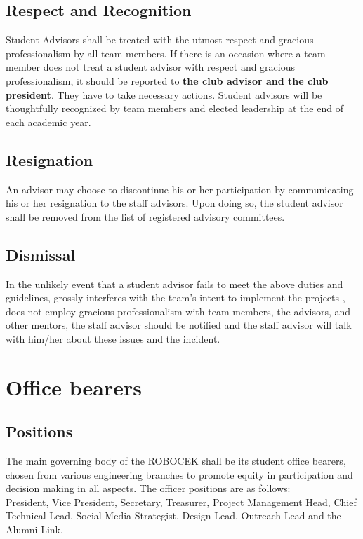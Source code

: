 \subsection{Respect and Recognition}
Student Advisors shall be treated with the utmost respect and gracious professionalism by all team members. If there is an occasion where a team member does not treat a student advisor with respect and gracious professionalism, it should be reported to \textbf{the club advisor and the club president}. They have to take necessary actions. Student advisors will be thoughtfully recognized by team members and elected leadership at the end of each academic year.

\subsection{Resignation}
An advisor may choose to discontinue his or her participation by communicating his or her resignation to the staff advisors. Upon doing so, the student advisor shall be removed from the list of registered advisory committees.

\subsection{Dismissal}
In the unlikely event that a student advisor fails to meet the above duties and guidelines, grossly interferes with the team’s intent to implement the projects , does not employ gracious professionalism with team members, the advisors, and other mentors, the staff advisor should be notified and the staff advisor will talk with him/her about these issues and the incident. 

\section{Office bearers}

\subsection{Positions}
The main governing body of the ROBOCEK shall be its student office bearers, chosen from various engineering branches to promote equity in participation and decision making in all aspects. The officer positions are as follows:\\

President, Vice President, Secretary, Treasurer, Project Management Head, Chief Technical Lead, Social Media Strategist, Design Lead, Outreach Lead and the Alumni Link.

